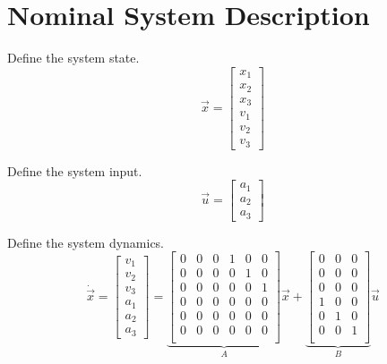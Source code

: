 \documentclass[12pt,onecolumn,reqno]{amsart}
\begin{document}
\section{Nominal System Description}
\label{sec:nominal_system}

Define the system state.
\begin{equation}
  \vec{x} = 
  \begin{bmatrix}
    x_{1} \\
    x_{2} \\
    x_{3} \\
    v_{1} \\
    v_{2} \\
    v_{3}
  \end{bmatrix}
\end{equation}

Define the system input.
\begin{equation}
  \vec{u} = 
  \begin{bmatrix}
    a_{1} \\
    a_{2} \\
    a_{3}
  \end{bmatrix}
\end{equation}

Define the system dynamics.
\begin{equation}
  \dot{\vec{x}}
  =
  \begin{bmatrix}
    v_{1} \\
    v_{2} \\
    v_{3} \\
    a_{1} \\
    a_{2} \\
    a_{3}
  \end{bmatrix}
  =
  \underbrace{
  \begin{bmatrix}
    0 & 0 & 0 & 1 & 0 & 0  \\
    0 & 0 & 0 & 0 & 1 & 0  \\
    0 & 0 & 0 & 0 & 0 & 1  \\
    0 & 0 & 0 & 0 & 0 & 0  \\
    0 & 0 & 0 & 0 & 0 & 0  \\
    0 & 0 & 0 & 0 & 0 & 0  \\
  \end{bmatrix}
  }_{A}
  \vec{x}
  +
  \underbrace{
  \begin{bmatrix}
    0 & 0 & 0 \\
    0 & 0 & 0 \\
    0 & 0 & 0 \\
    1 & 0 & 0 \\
    0 & 1 & 0 \\
    0 & 0 & 1 \\
  \end{bmatrix}
  }_{B}
  \vec{u}
\end{equation}
\end{document}
